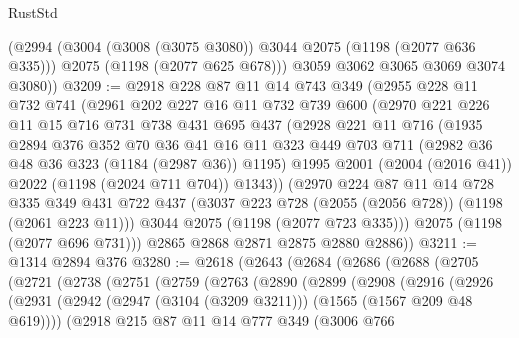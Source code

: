\begin{lexlean}{RustStd}
\begin{coremodule}
{\begin{coremodule}
{{{{{{{{{        (@2994
          (@3004 (@3008 (@3075 @3080)) @3044 @2075 (@1198 (@2077 @636 @335)))
          @2075
          (@1198 (@2077 @625 @678)))
        @3059
        @3062
        @3065
        @3069
        @3074
        @3080))
@3209 := @2918
    @228
    @87
    @11
    @14
    @743
    @349
    (@2955
      @228
      @11
      @732
      @741
      (@2961
        @202
        @227
        @16
        @11
        @732
        @739
        @600
        (@2970
          @221
          @226
          @11
          @15
          @716
          @731
          @738
          @431
          @695
          @437
          (@2928
            @221
            @11
            @716
            (@1935
              @2894
              @376
              @352
              @70
              @36
              @41
              @16
              @11
              @323
              @449
              @703
              @711
              (@2982 @36 @48 @36 @323 (@1184 (@2987 @36)) @1195)
              @1995
              @2001
              (@2004 (@2016 @41))
              @2022
              (@1198 (@2024 @711 @704))
              @1343))
          (@2970
            @224
            @87
            @11
            @14
            @728
            @335
            @349
            @431
            @722
            @437
            (@3037 @223 @728 (@2055 (@2056 @728)) (@1198 (@2061 @223 @11)))
            @3044
            @2075
            (@1198 (@2077 @723 @335)))
          @2075
          (@1198 (@2077 @696 @731)))
        @2865
        @2868
        @2871
        @2875
        @2880
        @2886))
@3211 := @1314 @2894 @376
@3280 := @2618
    (@2643
      (@2684
        (@2686
          (@2688
            (@2705
              (@2721
                (@2738
                  (@2751
                    (@2759
                      (@2763
                        (@2890
                          (@2899
                            (@2908
                              (@2916
                                (@2926
                                  (@2931
                                    (@2942
                                      (@2947 (@3104 (@3209 @3211)))
                                      (@1565 (@1567 @209 @48 @619))))
                                  (@2918
                                    @215
                                    @87
                                    @11
                                    @14
                                    @777
                                    @349
                                    (@3006
                                      @766
}}}}}}}}}
\end{coremodule}}
\end{coremodule}
\end{lexlean}
